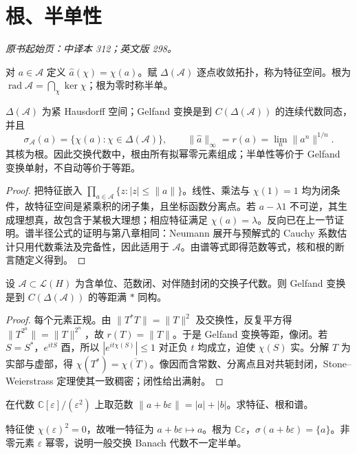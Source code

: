 \section{根、半单性}\label{sec:yosida-11-02}
\noindent\textit{原书起始页：中译本 312；英文版 298。}

\begin{definition}
对 $a\in\mathcal A$ 定义 $\widehat a(\chi)=\chi(a)$。赋 $\Delta(\mathcal A)$ 逐点收敛拓扑，称为特征空间。根为 $\operatorname{rad}\mathcal A=\bigcap_{\chi}\ker\chi$；根为零时称半单。
\end{definition}

\begin{theorem}\label{thm:y11-gelfand}
$\Delta(\mathcal A)$ 为紧 Hausdorff 空间；Gelfand 变换是到 $C(\Delta(\mathcal A))$ 的连续代数同态，并且
\[
 \sigma_{\mathcal A}(a)=\{\chi(a):\chi\in\Delta(\mathcal A)\},\qquad
 \|\widehat a\|_\infty=r(a)=\lim_n\|a^n\|^{1/n}.
\]
其核为根。因此交换代数中，根由所有拟幂零元素组成；半单性等价于 Gelfand 变换单射，不自动等价于等距。
\end{theorem}
\begin{proof}
把特征嵌入 $\prod_{a\in\mathcal A}\{z:|z|\le\|a\|\}$。线性、乘法与 $\chi(1)=1$ 均为闭条件，故特征空间是紧乘积的闭子集，且坐标函数分离点。若 $a-\lambda1$ 不可逆，其生成理想真，故包含于某极大理想；相应特征满足 $\chi(a)=\lambda$。反向已在上一节证明。谱半径公式的证明与第八章相同：Neumann 展开与预解式的 Cauchy 系数估计只用代数乘法及完备性，因此适用于 $\mathcal A$。由谱等式即得范数等式，核和根的断言随定义得到。
\end{proof}

\begin{theorem}\label{thm:y11-commutative-cstar}
设 $\mathcal A\subset\mathcal L(H)$ 为含单位、范数闭、对伴随封闭的交换子代数。则 Gelfand 变换是到 $C(\Delta(\mathcal A))$ 的等距满 $*$ 同构。
\end{theorem}
\begin{proof}
每个元素正规。由 $\|T^*T\|=\|T\|^2$ 及交换性，反复平方得 $\|T^{2^n}\|=\|T\|^{2^n}$，故 $r(T)=\|T\|$。于是 Gelfand 变换等距，像闭。若 $S=S^*$，$e^{itS}$ 酉，所以 $|e^{it\chi(S)}|\le1$ 对正负 $t$ 均成立，迫使 $\chi(S)$ 实。分解 $T$ 为实部与虚部，得 $\chi(T^*)=\overline{\chi(T)}$。像因而含常数、分离点且对共轭封闭，Stone--Weierstrass 定理使其一致稠密；闭性给出满射。
\end{proof}

\begin{exercise}[非零根]\label{ex:y11-radical}
在代数 $\mathbb C[\varepsilon]/(\varepsilon^2)$ 上取范数 $\|a+b\varepsilon\|=|a|+|b|$。求特征、根和谱。
\end{exercise}
\begin{solution}
特征使 $\chi(\varepsilon)^2=0$，故唯一特征为 $a+b\varepsilon\mapsto a$。根为 $\mathbb C\varepsilon$，$\sigma(a+b\varepsilon)=\{a\}$。非零元素 $\varepsilon$ 幂零，说明一般交换 Banach 代数不一定半单。
\end{solution}

